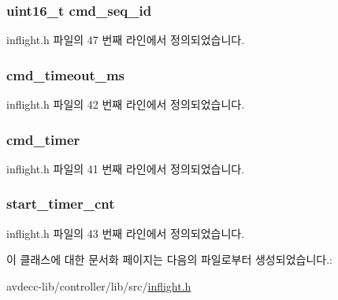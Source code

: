 \subsubsection[{\texorpdfstring{cmd\+\_\+seq\+\_\+id}{cmd_seq_id}}]{\setlength{\rightskip}{0pt plus 5cm}uint16\+\_\+t cmd\+\_\+seq\+\_\+id}\hypertarget{classavdecc__lib_1_1inflight_a8bdf72b053c3df68d591e3e067bd43ab}{}\label{classavdecc__lib_1_1inflight_a8bdf72b053c3df68d591e3e067bd43ab}


inflight.\+h 파일의 47 번째 라인에서 정의되었습니다.

\subsubsection[{\texorpdfstring{cmd\+\_\+timeout\+\_\+ms}{cmd_timeout_ms}}]{ cmd\+\_\+timeout\+\_\+ms\hspace{0.3cm}{\ttfamily [private]}}\hypertarget{classavdecc__lib_1_1inflight_afb6cdde363389e3856f0fe11955c34ba}{}\label{classavdecc__lib_1_1inflight_afb6cdde363389e3856f0fe11955c34ba}


inflight.\+h 파일의 42 번째 라인에서 정의되었습니다.

\subsubsection[{\texorpdfstring{cmd\+\_\+timer}{cmd_timer}}]{ cmd\+\_\+timer\hspace{0.3cm}{\ttfamily [private]}}\hypertarget{classavdecc__lib_1_1inflight_ae057e2c8b0dbeef2168924fdbc196d06}{}\label{classavdecc__lib_1_1inflight_ae057e2c8b0dbeef2168924fdbc196d06}


inflight.\+h 파일의 41 번째 라인에서 정의되었습니다.

\subsubsection[{\texorpdfstring{start\+\_\+timer\+\_\+cnt}{start_timer_cnt}}]{ start\+\_\+timer\+\_\+cnt\hspace{0.3cm}{\ttfamily [private]}}\hypertarget{classavdecc__lib_1_1inflight_aacd1252015b57c1a930e3a48a5e15ec2}{}\label{classavdecc__lib_1_1inflight_aacd1252015b57c1a930e3a48a5e15ec2}


inflight.\+h 파일의 43 번째 라인에서 정의되었습니다.



이 클래스에 대한 문서화 페이지는 다음의 파일로부터 생성되었습니다.\+:\begin{DoxyCompactItemize}
\item 
avdecc-\/lib/controller/lib/src/\hyperlink{inflight_8h}{inflight.\+h}\end{DoxyCompactItemize}
